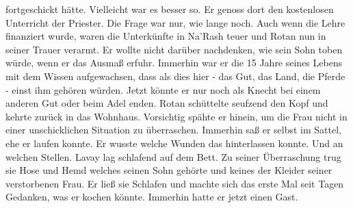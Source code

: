 fortgeschickt hätte. Vielleicht war es besser so. Er genoss dort den kostenlosen Unterricht der 
Priester. Die Frage war nur, wie lange noch. Auch wenn die Lehre finanziert wurde, waren die 
Unterkünfte in Na'Rash teuer und Rotan nun in seiner Trauer verarmt. Er wollte nicht darüber 
nachdenken, wie sein Sohn toben würde, wenn er das Ausmaß erfuhr. Immerhin war er die 15 Jahre 
seines Lebens mit dem Wissen aufgewachsen, dass als dies hier - das Gut, das Land, die Pferde - 
einst ihm gehören würden. Jetzt könnte er nur noch als Knecht bei einem anderen Gut oder beim Adel 
enden. Rotan schüttelte seufzend den Kopf und kehrte zurück in das Wohnhaus. Vorsichtig spähte er 
hinein, um die Frau nicht in einer unschicklichen Situation zu überraschen. Immerhin saß er selbst 
im Sattel, ehe er laufen konnte. Er wusste welche Wunden das hinterlassen konnte. Und an welchen 
Stellen. Lavay lag schlafend auf dem Bett. Zu seiner Überraschung trug sie Hose und Hemd welches 
seinen Sohn gehörte und keines der Kleider seiner verstorbenen Frau. Er ließ sie Schlafen und 
machte sich das erste Mal seit Tagen Gedanken, was er kochen könnte. Immerhin hatte er jetzt einen 
Gast.\\